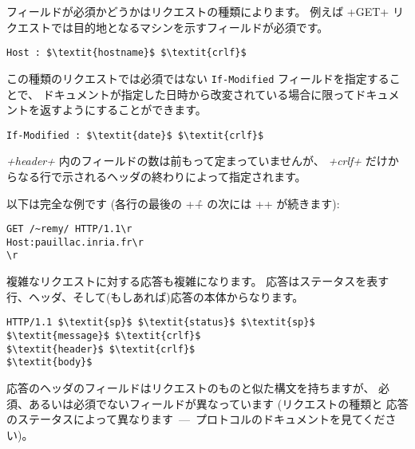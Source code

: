 フィールドが必須かどうかはリクエストの種類によります。
例えば \ml+GET+ リクエストでは目的地となるマシンを示すフィールドが必須です。
%
\begin{lstlisting}
Host : $\textit{hostname}$ $\textit{crlf}$
\end{lstlisting}
%
この種類のリクエストでは必須ではない \texttt{If-Modified} フィールドを指定することで、
ドキュメントが指定した日時から改変されている場合に限ってドキュメントを返すようにすることができます。
%
\begin{lstlisting}
If-Modified : $\textit{date}$ $\textit{crlf}$
\end{lstlisting}
%
\textit{\ml+header+} 内のフィールドの数は前もって定まっていませんが、
\textit{\ml+crlf+} だけからなる行で示されるヘッダの終わりによって指定されます。

以下は完全な例です (各行の最後の \ml+\r+ の次には \ml+\n+ が続きます):
%
\begin{lstlisting}
GET /~remy/ HTTP/1.1\r
Host:pauillac.inria.fr\r
\r
\end{lstlisting}
%
複雑なリクエストに対する応答も複雑になります。
応答はステータスを表す行、ヘッダ、そして(もしあれば)応答の本体からなります。
%
\begin{lstlisting}
HTTP/1.1 $\textit{sp}$ $\textit{status}$ $\textit{sp}$ $\textit{message}$ $\textit{crlf}$
$\textit{header}$ $\textit{crlf}$
$\textit{body}$
\end{lstlisting}
%
応答のヘッダのフィールドはリクエストのものと似た構文を持ちますが、
必須、あるいは必須でないフィールドが異なっています (リクエストの種類と
応答のステータスによって異なります~---~プロトコルのドキュメントを見てください)。

